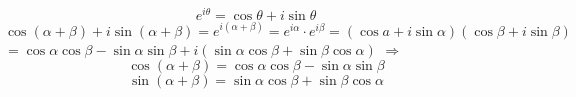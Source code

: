 \begin{equation}
{e^{i\theta }} = \cos \theta  + i\sin \theta 
\end{equation}
$
\cos \left( {\alpha  + \beta } \right) + i\sin \left( {\alpha  + \beta } \right) = {e^{i\left( {\alpha  + \beta } \right)}} = {e^{i\alpha }} \cdot {e^{i\beta }} = \left( {\cos a + i\sin \alpha } \right)\left( {\cos \beta  + i\sin \beta } \right)
$
$
= \cos \alpha \cos \beta  - \sin \alpha \sin \beta  + i\left( {\sin \alpha \cos \beta  + \sin \beta \cos \alpha } \right)
$
$
\Rightarrow
$
\begin{equation}
\cos \left( {\alpha  + \beta } \right) = \cos \alpha \cos \beta  - \sin \alpha \sin \beta
\end{equation}
\begin{equation}
\sin \left( {\alpha  + \beta } \right) = \sin \alpha \cos \beta  + \sin \beta \cos \alpha
\end{equation}
